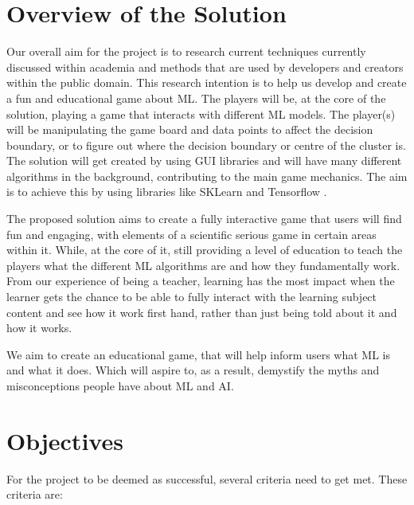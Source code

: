 	\section{Overview of the Solution}
		\label{sec:overview_of_solution}
		Our overall aim for the project is to research current techniques currently discussed within academia and methods that are used by developers and creators within the public domain. This research intention is to help us develop and create a fun and educational game about ML. The players will be, at the core of the solution, playing a game that interacts with different ML models. The player(s) will be manipulating the game board and data points to affect the decision boundary, or to figure out where the decision boundary or centre of the cluster is. The solution will get created by using  GUI libraries and will have many different algorithms in the background, contributing to the main game mechanics. The aim is to achieve this by using libraries like SKLearn \cite{sklearn_api} and Tensorflow \cite{tensorflow2015-whitepaper}.
		
		The proposed solution aims to create a fully interactive game that users will find fun and engaging, with elements of a scientific serious game in certain areas within it. While, at the core of it, still providing a level of education to teach the players what the different ML algorithms are and how they fundamentally work. From our experience of being a teacher, learning has the most impact when the learner gets the chance to be able to fully interact with the learning subject content and see how it work first hand, rather than just being told about it and how it works. 
		
		We aim to create an educational game, that will help inform users what ML is and what it does. Which will aspire to, as a result, demystify the myths and misconceptions people have about ML and AI.
		
	
	\section{Objectives}
	
	For the project to be deemed as successful, several criteria need to get met. These criteria are:
	
